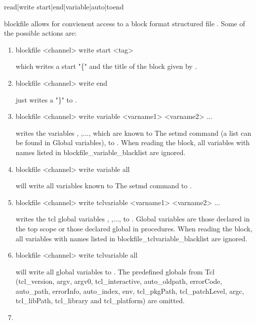 {
  read|write 
  start|end|variable|auto|toend
}

blockfile allows for convienent access to a block format structured
file . Some of the possible actions are:
\begin{enumerate}
 \item
\begin{code}
blockfile <channel>  write start <tag> 
\end{code}
which writes a start "\{" and the title of the block given by
.
 \item
\begin{code}
blockfile <channel> write end 
\end{code}
just writes a "\}" to .
 \item
\begin{code}
blockfile <channel> write variable {<varname1> <varname2> ...}
\end{code}
writes the variables , ,..., which are
known to The setmd command (a list can be found in Global variables),
to . When reading the block, all variables with names
listed in blockfile\_variable\_blacklist are ignored.
 \item
\begin{code}
blockfile <channel> write variable all
\end{code}
  will write all variables known to The setmd command to .
 \item
\begin{code}
blockfile <channel> write tclvariable {<varname1> <varname2> ...}
\end{code}
writes the tcl global variables , ,..., to
. Global variables are those declared in the top scope or
those declared global in procedures. When reading the block, all
variables with names listed in blockfile\_tclvariable\_blacklist are
ignored.
 \item
\begin{code}
blockfile <channel> write tclvariable all
\end{code}
will write all global variables to . The predefined
globals from Tcl (tcl\_version, argv, argv0, tcl\_interactive,
auto\_oldpath, errorCode, auto\_path, errorInfo, auto\_index, env,
tcl\_pkgPath, tcl\_patchLevel, argc, tcl\_libPath, tcl\_library and
tcl\_platform) are omitted.
 \item
\begin{code}

\end{code}
\end{enumerate}
